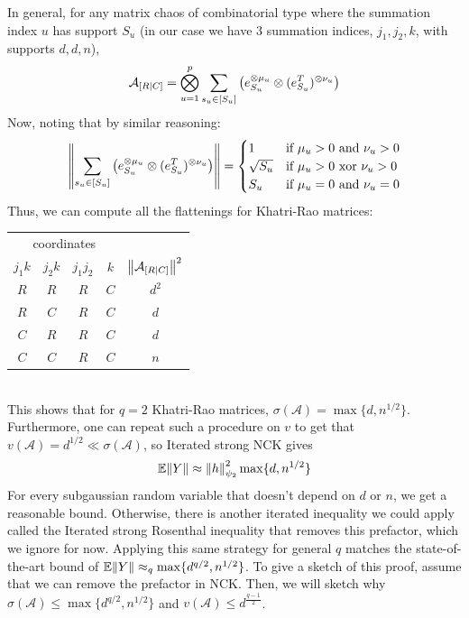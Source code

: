 In general,
for any matrix chaos of combinatorial type where the summation index $u$ has support $S_u$
(in our case we have $3$ summation indices, $j_1, j_2, k$, with supports $d, d, n$),
\[ \mathcal{A}_{[R \mid C]} = \bigotimes_{u = 1}^{p} \sum_{s_u \in [S_u]} \qty(e_{S_u}^{\otimes \mu_u} \otimes (e_{S_u}^T)^{\otimes \nu_u}) \]
Now, noting that by similar reasoning:
\[ \norm{\sum_{s_u \in [S_u]}\qty(e_{S_u}^{\otimes \mu_u} \otimes (e_{S_u}^T)^{\otimes \nu_u})} = \begin{cases}
    1 & \text{if } \mu_u > 0 \text{ and } \nu_u > 0 \\ 
    \sqrt{S_u} & \text{if } \mu_u > 0 \text{ xor } \nu_u > 0 \\
    S_u & \text{if } \mu_u = 0 \text{ and } \nu_u = 0
\end{cases}  \]
Thus, we can compute all the flattenings for Khatri-Rao matrices: 
\begin{table}[hbt!]
    \centering
    \begin{tabular}{| c | c | c | c | c |}
        \hline
        \multicolumn{4}{|c|}{coordinates} &  \\
        $j_1 k$ & $j_2 k$ & $j_1 j_2$ & $k$ & $\norm{\mathcal{A}_{[R|C]}}^2$ \\ \hline
        $R$ & $R$ & $R$ & $C$ & $d^2$ \\ \hline 
        $R$ & $C$ & $R$ & $C$ & $d$ \\ \hline
        $C$ & $R$ & $R$ & $C$ & $d$ \\ \hline
        $C$ & $C$ & $R$ & $C$ & $n$ \\ \hline
    \end{tabular}
\end{table}
\\
This shows that for $q = 2$ Khatri-Rao matrices, $\sigma(\mathcal{A}) = \max\{d, n^{1/2}\}$.
Furthermore, one can repeat such a procedure on $v$ to get that $v(\mathcal{A}) = d^{1/2} \ll \sigma(\mathcal{A})$, so Iterated strong NCK gives
\[ \mathbb{E} \norm{Y} \approx \norm{h}_{\psi_2}^2 \max\{d, n^{1/2}\} \]
For every subgaussian random variable that doesn't depend on $d$ or $n$, we get a reasonable bound. Otherwise, there is another iterated inequality
we could apply called the Iterated strong Rosenthal inequality that removes this prefactor, which we ignore for now.
Applying this same strategy for general $q$ matches 
the state-of-the-art bound of $\mathbb{E} \norm{Y} \approx_q \max\{d^{q/2}, n^{1/2}\}$.
To give a sketch of this proof, assume that we can remove the prefactor in NCK. Then, we will
sketch why $\sigma(\mathcal{A}) \le \max\{d^{q/2}, n^{1/2}\}$ and $v(\mathcal{A}) \le d^{\frac{q - 1}{2}}$.

